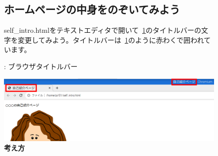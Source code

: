 \documentclass[a4paper,12pt]{jarticle}
\begin{document}
\clearpage
\begin{figure}[ht]
  \subsection{\theExercise ホームページの中身をのぞいてみよう}
  self\_intro.htmlをテキストエディタで開いて~\ref{seq:refFigure31}のタイトルバーの文字を変更してみよう。タイトルバーは~\ref{seq:refFigure31}のように赤わくで囲われています。


  \bigskip



  \centering
  \begin{minipage}{\textwidth}
    {\upshape
      {\theFigure\label{seq:refFigure31}}:
      ブラウザタイトルバー}
  \end{minipage}

  \centering
  \includegraphics[width=\textwidth]{textbook-img143.png}
  \flushleft
  \textbf{考え方}


\end{figure}
\end{document}
